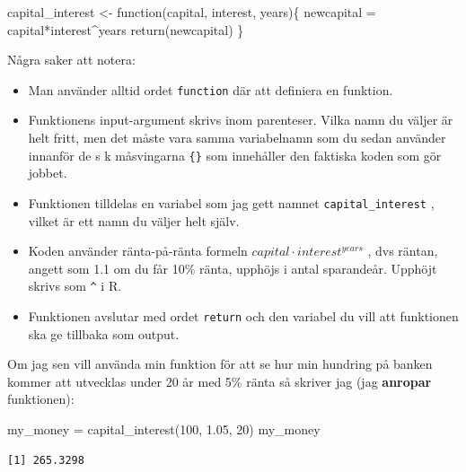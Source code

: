 \documentclass[
  letterpaper,
  DIV=11,
  numbers=noendperiod,
  oneside]{scrartcl}
\newenvironment{Shaded}{\begin{snugshade}}{\end{snugshade}}
\newcommand{\ControlFlowTok}[1]{\textcolor[rgb]{0.00,0.23,0.31}{#1}}
\newcommand{\DecValTok}[1]{\textcolor[rgb]{0.68,0.00,0.00}{#1}}
\newcommand{\FloatTok}[1]{\textcolor[rgb]{0.68,0.00,0.00}{#1}}
\newcommand{\FunctionTok}[1]{\textcolor[rgb]{0.28,0.35,0.67}{#1}}
\newcommand{\NormalTok}[1]{\textcolor[rgb]{0.00,0.23,0.31}{#1}}
\newcommand{\OtherTok}[1]{\textcolor[rgb]{0.00,0.23,0.31}{#1}}
\newcommand{\SpecialCharTok}[1]{\textcolor[rgb]{0.37,0.37,0.37}{#1}}
\begin{document}
\begin{Shaded}
\begin{Highlighting}[]
\NormalTok{capital\_interest }\OtherTok{\textless{}{-}} \ControlFlowTok{function}\NormalTok{(capital, interest, years)\{}
\NormalTok{  newcapital }\OtherTok{=}\NormalTok{ capital}\SpecialCharTok{*}\NormalTok{interest}\SpecialCharTok{\^{}}\NormalTok{years}
  \FunctionTok{return}\NormalTok{(newcapital)}
\NormalTok{\}}
\end{Highlighting}
\end{Shaded}

Några saker att notera:

\begin{itemize}
\item
  Man använder alltid ordet \texttt{function} där att definiera en
  funktion.
\item
  Funktionens input-argument skrivs inom parenteser. Vilka namn du
  väljer är helt fritt, men det måste vara samma variabelnamn som du
  sedan använder innanför de s k måsvingarna \texttt{\{\}} som
  innehåller den faktiska koden som gör jobbet.
\item
  Funktionen tilldelas en variabel som jag gett namnet
  \texttt{capital\_interest} , vilket är ett namn du väljer helt själv.
\item
  Koden använder ränta-på-ränta formeln
  \(capital\cdot interest^{years}\) , dvs räntan, angett som 1.1 om du
  får 10\% ränta, upphöjs i antal sparandeår. Upphöjt skrivs som
  \texttt{\^{}} i R.
\item
  Funktionen avslutar med ordet \texttt{return} och den variabel du vill
  att funktionen ska ge tillbaka som output.
\end{itemize}

Om jag sen vill använda min funktion för att se hur min hundring på
banken kommer att utvecklas under 20 år med 5\% ränta så skriver jag
(jag \textbf{anropar} funktionen):

\begin{Shaded}
\begin{Highlighting}[]
\NormalTok{my\_money }\OtherTok{=} \FunctionTok{capital\_interest}\NormalTok{(}\DecValTok{100}\NormalTok{, }\FloatTok{1.05}\NormalTok{, }\DecValTok{20}\NormalTok{)}
\NormalTok{my\_money}
\end{Highlighting}
\end{Shaded}

\begin{verbatim}
[1] 265.3298
\end{verbatim}
\end{document}
